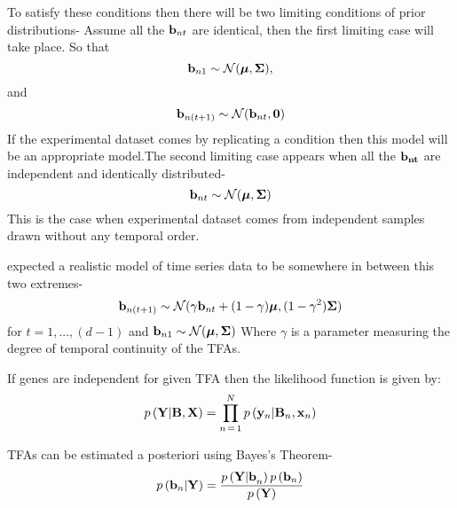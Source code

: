 To satisfy these conditions then there will be two limiting conditions of prior distributions-
Assume all the $\bold{b}_{nt}$ are identical, then the first limiting case will take place. So that
\begin{equation} \label{eq:limit_one_a}
   \bold{b}_{n1} \sim \mathcal{N} ( \boldsymbol{\mu},\boldsymbol{\Sigma}), 
\end{equation}
and
\begin{equation} \label{eq:limit_one_b}
   \bold{b}_{n(t+1)} \sim \mathcal{N} ( \bold{b}_{nt},\bold{0})
\end{equation}
If the experimental dataset comes by replicating a condition then this model will be an appropriate model.The second 
limiting case appears when all the $\bold{ b_{nt}}$ are independent and identically distributed-
\begin{equation} \label{eq:limit_two}
   \bold{b}_{nt}\sim \mathcal{N} ( \boldsymbol{\mu},\boldsymbol{\Sigma})
\end{equation}
This is the case when experimental dataset comes from independent samples drawn without any temporal order.

\cite{Sanguinetti:2006}  expected a realistic model of time series data to be somewhere in between this two extremes-
\begin{equation} \label{eq:tfa_SanG_update}
  \bold{b}_{n(t+1)} \sim \mathcal{N} (\gamma \bold{b}_{nt} + (1-\gamma)\boldsymbol{\mu},(1-\gamma^2)\boldsymbol{\Sigma})
\end{equation}
for $ t= 1, ... , (d-1)$ and $ \bold{b}_{n1} \sim \mathcal{N} ( \boldsymbol{\mu},\boldsymbol{\Sigma})$
Where $\gamma$ is a parameter measuring the degree of temporal continuity of the TFAs.
  
If genes are independent for given TFA then the likelihood function is given by:
\begin{equation} \label{eq:likelihood_fnc}
  p\left(\bold{Y|B,X}\right)= \displaystyle \prod_{n \mathop = 1}^{N} p\left(\bold{y}_n|\bold{B}_n,\bold{x}_n\right)
\end{equation}

TFAs can be estimated a posteriori using Bayes’s Theorem-
\begin{equation} \label{eq:Bayes_Theorem}
  p\left(\bold{b}_n|\bold{Y}\right)= \frac {p\left(\bold{Y|b}_n\right) p\left(\bold{b}_n\right)}{p\left(\bold{Y}\right)}
\end{equation}


